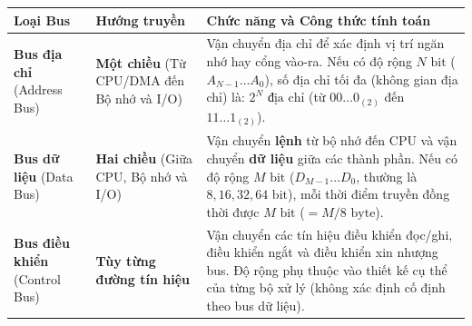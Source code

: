 \begin{tcolorbox}[bwbox, title=Bảng tổng hợp 3 loại Bus chức năng trong Bus hệ thống]
\begin{center}
\renewcommand{\arraystretch}{1.25}
\begin{tabularx}{\linewidth}{|L{3.2cm}|L{2.8cm}|Y|}
\hline
\textbf{Loại Bus} & \textbf{Hướng truyền} & \textbf{Chức năng và Công thức tính toán} \\ \hline
\textbf{Bus địa chỉ} \newline (Address Bus) & \textbf{Một chiều} \newline (Từ CPU/DMA đến Bộ nhớ và I/O) & Vận chuyển địa chỉ để xác định vị trí ngăn nhớ hay cổng vào-ra. \newline Nếu có độ rộng $N\text{ bit}$ ($A_{N-1} \dots A_0$), số địa chỉ tối đa (không gian địa chỉ) là: \textbf{$2^N\text{ địa chỉ}$} (từ $00\dots0_{(2)}$ đến $11\dots1_{(2)}$). \\ \hline
\textbf{Bus dữ liệu} \newline (Data Bus) & \textbf{Hai chiều} \newline (Giữa CPU, Bộ nhớ và I/O) & Vận chuyển \textbf{lệnh} từ bộ nhớ đến CPU và vận chuyển \textbf{dữ liệu} giữa các thành phần. \newline Nếu có độ rộng $M\text{ bit}$ ($D_{M-1} \dots D_0$, thường là $8, 16, 32, 64\text{ bit}$), mỗi thời điểm truyền đồng thời được $M\text{ bit}$ ($= M/8\text{ byte}$). \\ \hline
\textbf{Bus điều khiển} \newline (Control Bus) & \textbf{Tùy từng đường tín hiệu} & Vận chuyển các tín hiệu điều khiển đọc/ghi, điều khiển ngắt và điều khiển xin nhượng bus. Độ rộng phụ thuộc vào thiết kế cụ thể của từng bộ xử lý (không xác định cố định theo bus dữ liệu). \\ \hline
\end{tabularx}
\end{center}
\end{tcolorbox}

